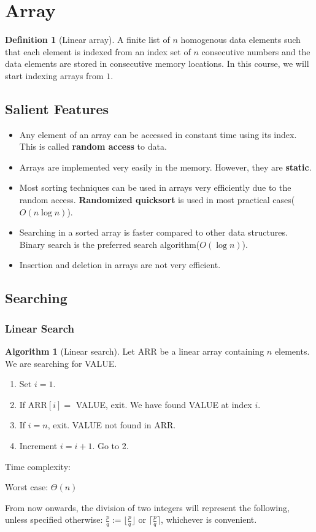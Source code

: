 \documentclass[10pt, a4paper]{extarticle}
\theoremstyle{definition}
\newtheorem{alg}{Algorithm}
\newtheorem{defn}{Definition}
\begin{document}
	\section{Array}
	\begin{defn}[Linear array]
		A finite list of $n$ homogenous data elements such that each element is indexed from an index set of $n$ consecutive numbers and the data elements are stored in consecutive memory locations.
		In this course, we will start indexing arrays from $1$.
	\end{defn}
		\subsection{Salient Features}
		\begin{itemize}
			\item Any element of an array can be accessed in constant time using its index. This is called \textbf{random access} to data.
			\item Arrays are implemented very easily in the memory. However, they are \textbf{static}.
		\item Most sorting techniques can be used in arrays very efficiently due to the random access. \textbf{Randomized quicksort} is used in most practical cases($O(n\log n)$).
		\item Searching in a sorted array is faster compared to other data structures. Binary search is the preferred search algorithm($O(\log n)$).
		\item Insertion and deletion in arrays are not very efficient.
		\end{itemize}
	
	\subsection{Searching}
	\subsubsection{Linear Search}
	\begin{alg}[Linear search]
		Let ARR be a linear array containing $n$ elements. We are searching for VALUE.
		\begin{enumerate}
			\item Set $i=1$.
			\item If ARR$[i]=$ VALUE, exit. We have found VALUE at index $i$.
			\item If $i=n$, exit. VALUE not found in ARR.
			\item Increment $i=i+1$. Go to 2.
		\end{enumerate}
		Time complexity:

		Worst case: $\Theta(n)$
	\end{alg}
	From now onwards, the division of two integers will represent the following, unless specified otherwise: $\frac{p}{q}:=\lfloor\frac{p}{q}\rfloor$ or $\lceil\frac{p}{q}\rceil$, whichever is convenient.
\end{document}
